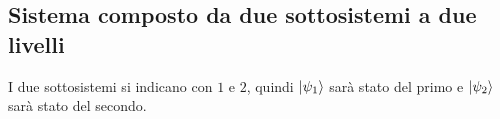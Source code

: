 \documentclass[10pt, a4paper]{scrartcl} %
\numberwithin{equation}{subsection}
\theoremstyle{style2}
\theoremstyle{style1}
\begin{document}
\subsection{Sistema composto da due sottosistemi a due livelli}
I due sottosistemi si indicano con $1$ e $2$, quindi $\ket{\psi _1}$ sar\`a stato del primo e $\ket{\psi _2} $ sar\`a stato del secondo.
\end{document}

